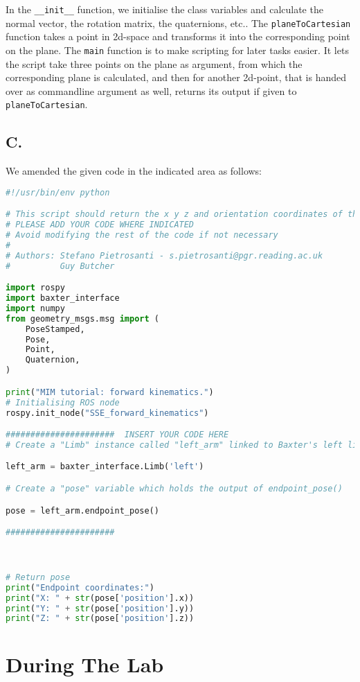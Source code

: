 \documentclass[10pt,a4paper]{scrartcl}
\newcounter{points}
\begin{document}
In the \lstinline!__init__! function, we initialise the class variables
and calculate the normal vector, the rotation matrix, the quaternions,
etc.. The \lstinline!planeToCartesian! function takes a point in
2d-space and transforms it into the corresponding point on the plane.
The \lstinline!main! function is to make scripting for later tasks
easier. It lets the script take three points on the plane as argument,
from which the corresponding plane is calculated, and then for another
2d-point, that is handed over as commandline argument as well, returns
its output if given to \lstinline!planeToCartesian!.

\subsection{C.}\label{c.}

We amended the given code in the indicated area as follows:

\begin{lstlisting}[language=Python]
#!/usr/bin/env python

# This script should return the x y z and orientation coordinates of the end effector of the left limb.
# PLEASE ADD YOUR CODE WHERE INDICATED
# Avoid modifying the rest of the code if not necessary
#
# Authors: Stefano Pietrosanti - s.pietrosanti@pgr.reading.ac.uk
#          Guy Butcher

import rospy
import baxter_interface
import numpy
from geometry_msgs.msg import (
    PoseStamped,
    Pose,
    Point,
    Quaternion,
)

print("MIM tutorial: forward kinematics.")
# Initialising ROS node
rospy.init_node("SSE_forward_kinematics")

######################  INSERT YOUR CODE HERE
# Create a "Limb" instance called "left_arm" linked to Baxter's left limb

left_arm = baxter_interface.Limb('left')

# Create a "pose" variable which holds the output of endpoint_pose()

pose = left_arm.endpoint_pose()

######################



# Return pose
print("Endpoint coordinates:")
print("X: " + str(pose['position'].x))
print("Y: " + str(pose['position'].y))
print("Z: " + str(pose['position'].z))
\end{lstlisting}

\section{During The Lab}\label{during-the-lab}
\end{document}
